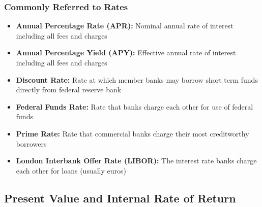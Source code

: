 \documentclass[11pt]{article}
\begin{document}
\subsubsection{Commonly Referred to Rates}
\begin{itemize}
\item \textbf{Annual Percentage Rate (APR):} Nominal annual rate of interest including all fees and charges
\item \textbf{Annual Percentage Yield (APY):} Effective annual rate of interest including all fees and charges
\item \textbf{Discount Rate:} Rate at which member banks may borrow short term funds directly from federal reserve bank 
\item \textbf{Federal Funds Rate:} Rate that banks charge each other for use of federal funds
\item \textbf{Prime Rate:} Rate that commercial banks charge their most creditworthy borrowers
\item \textbf{London Interbank Offer Rate (LIBOR):} The interest rate banks charge each other for loans (usually euros)
\end{itemize}
\pagebreak

\subsection{Present Value and Internal Rate of Return}
\end{document}
